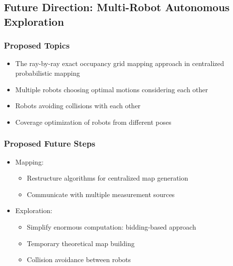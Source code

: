 \documentclass[11pt,professionalfonts,hyperref={pdftex,pdfpagemode=none,pdfstartview=FitH}]{beamer}
\begin{document}
\begin{frame}
\frametitle{}
{}
\end{frame}

\subsection*{Future Direction: Multi-Robot Autonomous Exploration}

\begin{frame}
\frametitle{Proposed Topics}
\begin{itemize}
        	\item The ray-by-ray exact occupancy grid mapping approach in centralized probabilistic mapping
	\item Multiple robots choosing optimal motions considering each other
	\item Robots avoiding collisions with each other
	\item Coverage optimization of robots from different poses
\end{itemize}

\end{frame}

\begin{frame}
\frametitle{Proposed Future Steps}
\begin{itemize}
        	\item Mapping:
	\begin{itemize}
		\item Restructure algorithms for centralized map generation
		\item Communicate with multiple measurement sources
	\end{itemize}
	\item Exploration:
	\begin{itemize}
		\item Simplify enormous computation: bidding-based approach
		\item Temporary theoretical map building
		\item Collision avoidance between robots
	\end{itemize}
\end{itemize}

\end{frame}



\section*{}
\end{document}
